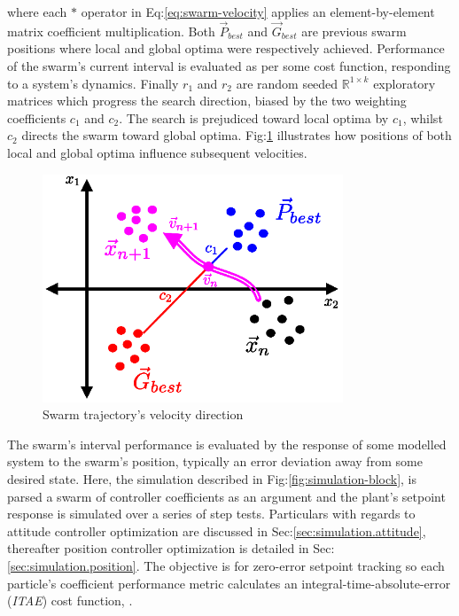 where each $\ast$ operator in Eq:\ref{eq:swarm-velocity} applies an element-by-element matrix coefficient multiplication. Both $\vec{P}_{best}$ and $\vec{G}_{best}$ are previous swarm positions where local and global optima were respectively achieved. Performance of the swarm's current interval is evaluated as per some cost function, responding to a system's dynamics. Finally $r_1$ and $r_2$ are random seeded $\mathbb{R}^{1\times k}$ exploratory matrices which progress the search direction, biased by the two weighting coefficients $c_1$ and $c_2$. The search is prejudiced toward local optima by $c_1$, whilst $c_2$ directs the swarm toward global optima. Fig:\ref{fig:swarm-trajectory} illustrates how positions of both local and global optima influence subsequent velocities.
\begin{figure}[hbtp]
\centering
\includegraphics[width=0.8\textwidth]{figs/swarm-trajectory}
\vspace{-10pt}
\caption{Swarm trajectory's velocity direction}
\label{fig:swarm-trajectory}
\vspace{-8pt}
\end{figure}
\par
The swarm's interval performance is evaluated by the response of some modelled system to the swarm's position, typically an error deviation away from some desired state. Here, the simulation described in Fig:\ref{fig:simulation-block}, is parsed a swarm of controller coefficients as an argument and the plant's setpoint response is simulated over a series of step tests. Particulars with regards to attitude controller optimization are discussed in Sec:\ref{sec:simulation.attitude}, thereafter position controller optimization is detailed in Sec:\ref{sec:simulation.position}. The objective is for zero-error setpoint tracking so each particle's coefficient performance metric calculates an integral-time-absolute-error (\emph{ITAE}) cost function, \cite{ITAE}.
